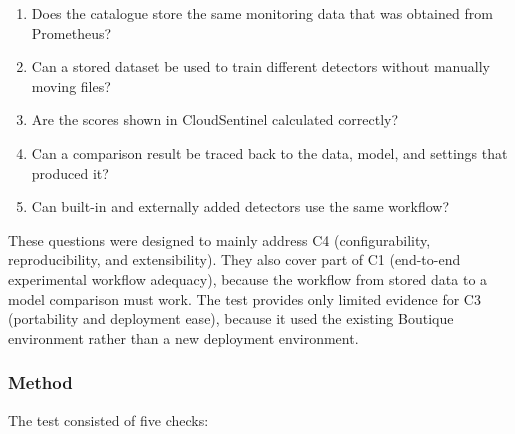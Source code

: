 \begin{enumerate}
    \item Does the catalogue store the same monitoring data that was obtained from Prometheus?
    \item Can a stored dataset be used to train different detectors without manually moving files?
    \item Are the scores shown in CloudSentinel calculated correctly?
    \item Can a comparison result be traced back to the data, model, and settings that produced it?
    \item Can built-in and externally added detectors use the same workflow?
\end{enumerate}

These questions were designed to mainly address C4 (configurability, reproducibility, and extensibility). They also cover part of C1 (end-to-end experimental workflow adequacy), because the workflow from stored data to a model comparison must work. The test provides only limited evidence for C3 (portability and deployment ease), because it used the existing Boutique environment rather than a new deployment environment.

\subsubsection{Method}

The test consisted of five checks:

